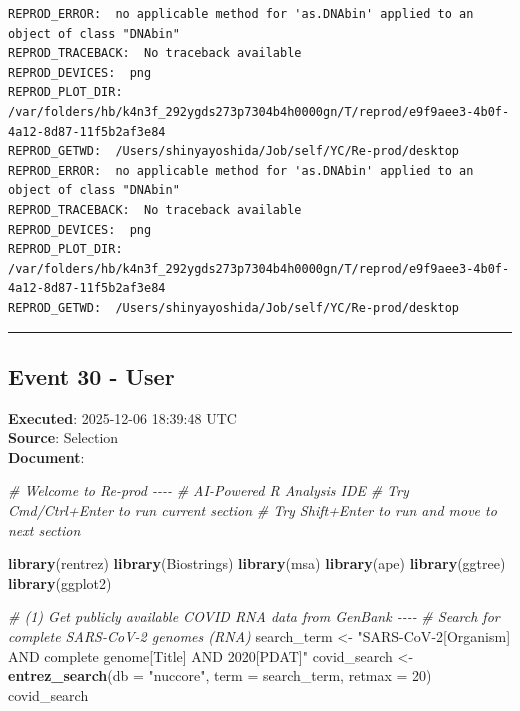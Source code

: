 \documentclass[
  11pt,
]{article}
\newenvironment{Shaded}{\begin{snugshade}}{\end{snugshade}}
\newcommand{\AttributeTok}[1]{\textcolor[rgb]{0.13,0.29,0.53}{#1}}
\newcommand{\CommentTok}[1]{\textcolor[rgb]{0.56,0.35,0.01}{\textit{#1}}}
\newcommand{\DecValTok}[1]{\textcolor[rgb]{0.00,0.00,0.81}{#1}}
\newcommand{\FunctionTok}[1]{\textcolor[rgb]{0.13,0.29,0.53}{\textbf{#1}}}
\newcommand{\NormalTok}[1]{#1}
\newcommand{\OtherTok}[1]{\textcolor[rgb]{0.56,0.35,0.01}{#1}}
\newcommand{\StringTok}[1]{\textcolor[rgb]{0.31,0.60,0.02}{#1}}
\newenvironment{rpoutput}{\vspace{0.5em}\begin{snugshade}}{\end{snugshade}}
\begin{document}
\begin{rpoutput}

\begin{verbatim}
REPROD_ERROR:  no applicable method for 'as.DNAbin' applied to an object of class "DNAbin" 
REPROD_TRACEBACK:  No traceback available  
REPROD_DEVICES:  png 
REPROD_PLOT_DIR:  /var/folders/hb/k4n3f_292ygds273p7304b4h0000gn/T/reprod/e9f9aee3-4b0f-4a12-8d87-11f5b2af3e84 
REPROD_GETWD:  /Users/shinyayoshida/Job/self/YC/Re-prod/desktop 
REPROD_ERROR:  no applicable method for 'as.DNAbin' applied to an object of class "DNAbin" 
REPROD_TRACEBACK:  No traceback available  
REPROD_DEVICES:  png 
REPROD_PLOT_DIR:  /var/folders/hb/k4n3f_292ygds273p7304b4h0000gn/T/reprod/e9f9aee3-4b0f-4a12-8d87-11f5b2af3e84 
REPROD_GETWD:  /Users/shinyayoshida/Job/self/YC/Re-prod/desktop 
\end{verbatim}

\end{rpoutput}

\begin{center}\rule{0.5\linewidth}{0.5pt}\end{center}

\subsection{Event 30 - User}\label{event-30---user}

\textbf{Executed}: 2025-12-06 18:39:48 UTC\\
\textbf{Source}: Selection\\
\textbf{Document}:

\begin{Shaded}
\begin{Highlighting}[]
\CommentTok{\# Welcome to Re{-}prod {-}{-}{-}{-}}
\CommentTok{\# AI{-}Powered R Analysis IDE}
\CommentTok{\# Try Cmd/Ctrl+Enter to run current section}
\CommentTok{\# Try Shift+Enter to run and move to next section}

\FunctionTok{library}\NormalTok{(rentrez)}
\FunctionTok{library}\NormalTok{(Biostrings)}
\FunctionTok{library}\NormalTok{(msa)}
\FunctionTok{library}\NormalTok{(ape)}
\FunctionTok{library}\NormalTok{(ggtree)}
\FunctionTok{library}\NormalTok{(ggplot2)}

\CommentTok{\# (1) Get publicly available COVID RNA data from GenBank {-}{-}{-}{-}}
\CommentTok{\# Search for complete SARS{-}CoV{-}2 genomes (RNA)}
\NormalTok{search\_term }\OtherTok{\textless{}{-}} \StringTok{"SARS{-}CoV{-}2[Organism] AND complete genome[Title] AND 2020[PDAT]"}
\NormalTok{covid\_search }\OtherTok{\textless{}{-}} \FunctionTok{entrez\_search}\NormalTok{(}\AttributeTok{db =} \StringTok{"nuccore"}\NormalTok{,}
                              \AttributeTok{term =}\NormalTok{ search\_term,}
                              \AttributeTok{retmax =} \DecValTok{20}\NormalTok{)}
\NormalTok{covid\_search}
\end{Highlighting}
\end{Shaded}
\end{document}
